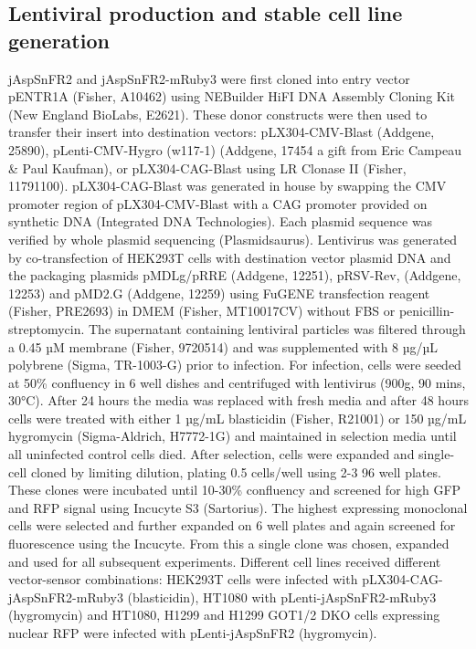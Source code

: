 \documentclass[9pt,lineno]{elife}
\begin{document}
\subsection{Lentiviral production and stable cell line generation}
jAspSnFR2 and jAspSnFR2-mRuby3 were first cloned into entry vector pENTR1A (Fisher, A10462) using NEBuilder HiFI DNA Assembly Cloning Kit (New England BioLabs, E2621).
These donor constructs were then used to transfer their insert into destination vectors: pLX304-CMV-Blast (Addgene, 25890), pLenti-CMV-Hygro (w117-1) (Addgene, 17454 a gift from Eric Campeau \& Paul Kaufman), or pLX304-CAG-Blast using LR Clonase II (Fisher, 11791100).
pLX304-CAG-Blast was generated in house by swapping the CMV promoter region of pLX304-CMV-Blast with a CAG promoter provided on synthetic DNA (Integrated DNA Technologies).
Each plasmid sequence was verified by whole plasmid sequencing (Plasmidsaurus).
Lentivirus was generated by co-transfection of HEK293T cells with destination vector plasmid DNA and the packaging plasmids pMDLg/pRRE (Addgene, 12251), pRSV-Rev, (Addgene, 12253) and pMD2.G (Addgene, 12259) using FuGENE transfection reagent (Fisher, PRE2693) in DMEM (Fisher, MT10017CV) without FBS or penicillin-streptomycin.
The supernatant containing lentiviral particles was filtered through a 0.45 µM membrane (Fisher, 9720514) and was supplemented with 8 µg/µL polybrene (Sigma, TR-1003-G) prior to infection.
For infection, cells were seeded at 50\% confluency in 6 well dishes and centrifuged with lentivirus (900g, 90 mins, 30°C).
After 24 hours the media was replaced with fresh media and after 48 hours cells were treated with either 1 µg/mL blasticidin (Fisher, R21001) or 150 µg/mL hygromycin (Sigma-Aldrich, H7772-1G) and maintained in selection media until all uninfected control cells died.
After selection, cells were expanded and single-cell cloned by limiting dilution, plating 0.5 cells/well using 2-3 96 well plates.
These clones were incubated until 10-30\% confluency and screened for high GFP and RFP signal using Incucyte S3 (Sartorius).
The highest expressing monoclonal cells were selected and further expanded on 6 well plates and again screened for fluorescence using the Incucyte.
From this a single clone was chosen, expanded and used for all subsequent experiments.
Different cell lines received different vector-sensor combinations: HEK293T cells were infected with pLX304-CAG-jAspSnFR2-mRuby3 (blasticidin), HT1080 with pLenti-jAspSnFR2-mRuby3 (hygromycin) and HT1080, H1299 and H1299 GOT1/2 DKO cells expressing nuclear RFP were infected with pLenti-jAspSnFR2 (hygromycin).
\end{document}
